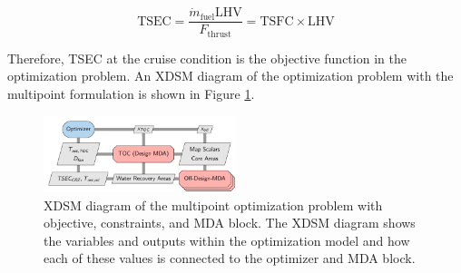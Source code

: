 \documentclass[conf]{new-aiaa}
\begin{document}
\begin{equation}
    \mathrm{TSEC} = \frac{\dot{m}_{\mathrm{fuel}} \mathrm{LHV}}{F_{\mathrm{thrust}}} = \mathrm{TSFC} \times \mathrm{LHV}
    \label{eq:tsec}
\end{equation}

Therefore, TSEC at the cruise condition is the objective function in the optimization problem.
An XDSM diagram of the optimization problem with the multipoint formulation is shown in Figure \ref{fig:N3_opt_xdsm}.

\begin{figure}[!hbt]
    \centering
    \includegraphics[width=0.5\textwidth]{N3_opt_XDSM.pdf}
    \caption{
        XDSM diagram of the multipoint optimization problem with objective, constraints, and MDA block.
        The XDSM diagram shows the variables and outputs within the optimization model and how each of these values is connected to the optimizer and MDA block.}
    \label{fig:N3_opt_xdsm}
\end{figure}

\end{document}
